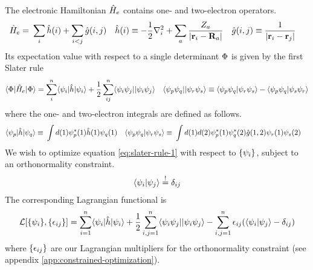 \documentclass[11pt]{article}
\numberwithin{equation}{section}
\begin{document}
The electronic Hamiltonian $\hat{H}_e$ contains one- and two-electron operators.
\begin{align}
	\hat{H}_e
=&\
	\sum_i
	\hat{h}(i)
+
	\sum_{i<j}
	\hat{g}(i,j)
&
	\hat{h}(i)
&\equiv
-
  \frac {1}{2}
	\nabla_i^2
+
  \sum_a
	\frac {Z_a}{|\mathbf{r}_i-\mathbf{R}_a|}
&
	\hat{g}(i,j)
&\equiv
	\frac {1}{|\mathbf{r}_i-\mathbf{r}_j|}
\end{align}
Its expectation value with respect to a single determinant $\Phi $ is given by the first Slater rule
\begin{align}
\label{eq:slater-rule-1}
	\langle\Phi |\hat{H}_e|\Phi \rangle
=
\sum_{i}^n
	\langle\psi _i|\hat{h}|\psi _i\rangle
+\frac {1}{2}\sum_{ij}^n
	\langle\psi _i\psi _j||\psi _i\psi _j\rangle
&&
	\langle\psi _p\psi _q||\psi _r\psi _s\rangle
\equiv
	\langle\psi _p\psi _q|\psi _r\psi _s\rangle
-
	\langle\psi _p\psi _q|\psi _s\psi _r\rangle
\end{align}
where the one- and two-electron integrals are defined as follows.
\begin{align}
\label{eq:one-electron integrals}
	\langle\psi _p|\hat{h}|\psi _q\rangle
\equiv&\
  \int
  d(1)
	\psi _p^*(1)
	\hat{h}(1)
	\psi _q(1)
&
	\langle\psi _p\psi _q|\psi _r\psi _s\rangle
\equiv&\
  \int
  d(1)d(2)
	\psi _p^*(1)\psi _q^*(2)
	\hat{g}(1,2)
	\psi _r(1)\psi _s(2)
\end{align}
We wish to optimize equation \ref{eq:slater-rule-1} with respect to $\{\psi _i\}$, subject to an orthonormality constraint.
\begin{align}
	\langle\psi _i|\psi _j\rangle
\overset{!}{=}
  \delta _{ij}
\end{align}
The corresponding Lagrangian functional is
\begin{align}
\label{lagrangian}
	\mathcal{L}[\{\psi _i\},\{\epsilon _{ij}\}]
=
  \sum_{i=1}^n
	\langle\psi _i|\hat{h}|\psi _i\rangle
+
  \frac {1}{2}
  \sum_{i,j=1}^n
	\langle\psi _i\psi _j||\psi _i\psi _j\rangle
-
  \sum_{i,j=1}^n
	\epsilon _{ij}(\langle\psi _i|\psi _j\rangle-\delta _{ij})
\end{align}
where $\{\epsilon _{ij}\}$ are our Lagrangian multipliers for the orthonormality constraint (see appendix \ref{app:constrained-optimization}).



\newpage
\appendix
\end{document}
